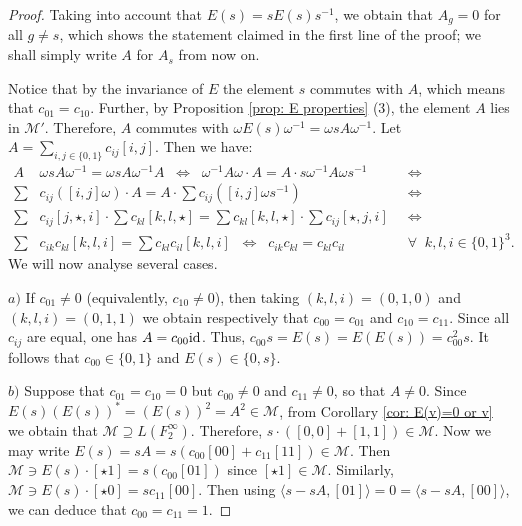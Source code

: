 \documentclass[11pt]{amsart}
\newcommand{\id}{{\rm id}}
\theoremstyle{plain}
\theoremstyle{definition}
\theoremstyle{remark}
\numberwithin{equation}{section}
\begin{document}
\begin{proof}
\smallskip
 Taking into account that $E(s)=sE(s)s^{-1}$, we obtain that $A_g=0$ for all $g\neq s$, which shows the statement claimed in the first line of the proof; we shall simply write $A$ for $A_s$ from now on.
\smallskip 
 
Notice that by the invariance of $E$ the element $s$ commutes with $A$, which means that $c_{01}=c_{10}$.
Further, by Proposition \ref{prop: E properties} (3), the element $A$ lies in $\mathcal M'$. Therefore, $A$ commutes with $\omega E(s)\omega^{-1}=\omega sA\omega^{-1}$. Let $A=\sum_{i,j\in\{0,1\}}c_{ij}[i,j]$. Then we have:
 \begin{align*}
 	A&\omega s A\omega^{-1}=\omega s A\omega^{-1}A\;\;\Longleftrightarrow\;\;\omega^{-1}A\omega\cdot A=A\cdot s\omega^{-1}A\omega s^{-1}\;\;&\Longleftrightarrow\\
 	\sum  &  c_{ij}([i,j]\omega)\cdot A=A\cdot\sum c_{ij}([i,j]\omega s^{-1})\;\;&\Longleftrightarrow\\ 
 	\sum &   c_{ij}[j,\star,i]\cdot \sum c_{kl}[k,l,\star]   =\sum c_{kl}[k,l,\star]\cdot \sum c_{ij}[\star,j,i]      \;\;&
 	\Longleftrightarrow \\ \sum & c_{ik}c_{kl}[k,l,i] =\sum c_{kl}c_{il}[k,l,i]   \;\;\Longleftrightarrow\;\; c_{ik}c_{kl}=c_{kl}c_{il}\;\;&\forall\;\;k,l,i\in\{0,1\}^3.\;\;\;\;\;\;\;\;\;\;\;\;\;\;
 \end{align*}
We will now analyse several cases.

\smallskip 
\noindent $a)$ If $c_{01}\neq 0$ (equivalently, $c_{10}\neq 0$), then taking $(k,l,i)=(0,1,0)$ and $(k,l,i)=(0,1,1)$ we obtain respectively that $c_{00}=c_{01}$ and $c_{10}=c_{11}$. Since all $c_{ij}$ are equal, one has $A=c_{00}\id$. Thus, $c_{00}s=E(s)=E(E(s))=c_{00}^2s$. It follows that $c_{00}\in \{0,1\}$ and $E(s)\in \{0,s\}$.

\smallskip\noindent
 $b)$ Suppose that $c_{01}=c_{10}=0$ but $c_{00}\neq 0$ and $c_{11}\neq 0$, so that $A \neq 0$. Since $E(s)(E(s))^*=(E(s))^2=A^2\in \mathcal M$, from Corollary \ref{cor: E(v)=0 or v} we obtain that $\mathcal M\supseteq L(F_2^\infty)$. Therefore, $s\cdot ([0,0]+[1,1])\in \mathcal M$. Now we may write $E(s)=sA=s(c_{00}[00]+c_{11}[11])\in \mathcal{M}$. Then $\mathcal{M}\ni E(s)\cdot[\star1]=s(c_{00}[01])$ since $[\star1]\in\mathcal{M}$. Similarly, $\mathcal{M}\ni E(s)\cdot [\star0]=sc_{11}[00]$. Then using $\langle s-sA, [01]\rangle=0=\langle s-sA,[00]\rangle$, we can deduce that $c_{00}=c_{11}=1$.


\end{proof}
\end{document}
